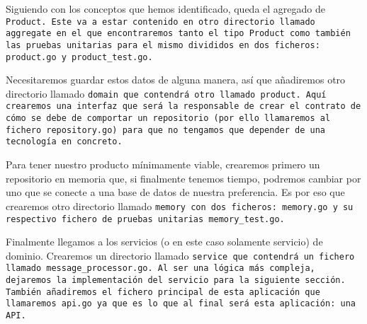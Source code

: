 Siguiendo con los conceptos que hemos identificado, queda el agregado de 
\tt{Product}. Este va a estar contenido en otro directorio llamado \tt{aggregate} 
en el que encontraremos tanto el tipo \tt{Product} como también las pruebas 
unitarias para el mismo divididos en dos ficheros: \tt{product.go} y 
\tt{product\_test.go}.

Necesitaremos guardar estos datos de alguna manera, así que añadiremos otro 
directorio llamado \tt{domain} que contendrá otro llamado \tt{product}. Aquí 
crearemos una interfaz que será la responsable de crear el contrato de cómo se debe 
de comportar un repositorio (por ello llamaremos al fichero \tt{repository.go}) 
para que no tengamos que depender de una tecnología en concreto. 

Para tener nuestro producto mínimamente viable, crearemos primero un repositorio en 
memoria que, si finalmente tenemos tiempo, podremos cambiar por uno que se conecte 
a una base de datos de nuestra preferencia. Es por eso que crearemos otro 
directorio llamado \tt{memory} con dos ficheros: \tt{memory.go} y su respectivo 
fichero de pruebas unitarias \tt{memory\_test.go}.

Finalmente llegamos a los servicios (o en este caso solamente servicio) de dominio. 
Crearemos un directorio llamado \tt{service} que contendrá un fichero llamado 
\tt{message_processor.go}. Al ser una lógica más compleja, dejaremos la 
implementación del servicio para la siguiente sección. También añadiremos el 
fichero principal de esta aplicación que llamaremos \tt{api.go} ya que es lo que 
al final será esta aplicación: una API.
